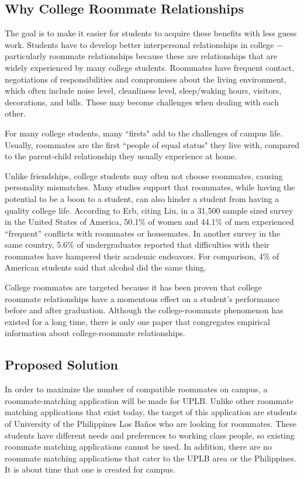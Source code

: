 \documentclass[journal]{./IEEE/IEEEtran}
\newcommand{\UPLB}{University of the Philippines Los Ba\~{n}os }
\begin{document}
    \subsection{Why College Roommate Relationships}
    The goal is to make it easier for students to acquire these benefits with less guess work. Students have to develop better interpersonal relationships in college $-$ particularly roommate relationships because these are relationships that are widely experienced by many college students\cite{erb}. Roommates have frequent contact, negotiations of responsibilities and compromises about the living environment, which often include noise level, cleanliness level, sleep/waking hours, visitors, decorations, and bills\cite{erb}. These may become challenges when dealing with each other.

    For many college students, many {``firsts"} add to the challenges of campus life. Usually, roommates are the first {``people of equal status"} they live with, compared to the parent-child relationship they usually experience at home\cite{erb}.

    Unlike friendships, college students may often not choose roommates, causing personality mismatches. Many studies support that roommates, while having the potential to be a boon to a student, can also hinder a student from having a quality college life. According to Erb\cite{erb}, citing Liu\cite{liu}, in a 31,500 sample sized survey in the United States of America, 50.1\% of women and 44.1\% of men experienced “frequent” conflicts with roommates or housemates. In another survey in the same country, 5.6\% of undergraduates reported that difficulties with their roommates have hampered their academic endeavors\cite{erb}. For comparison, 4\% of American students said that alcohol did the same thing\cite{erb}.

    College roommates are targeted because it has been proven that college roommate relationships have a momentous effect on a student's performance before and after graduation. Although the college-roommate phenomenon has existed for a long time, there is only one paper that congregates empirical information about college-roommate relationships\cite{erb}.

    \subsection{Proposed Solution}
    In order to maximize the number of compatible roommates on campus, a roommate-matching application will be made for
    UPLB. Unlike other roommate matching applications that exist today, the target of this application are students of
    \UPLB who are looking for roommates. These students have different needs and preferences to working class people, so existing roommate matching applications cannot be used. In addition, there are no roommate matching applications that cater to the UPLB area or the Philippines. It is about time that one is created for campus.
\pubidadjcol
\end{document}
